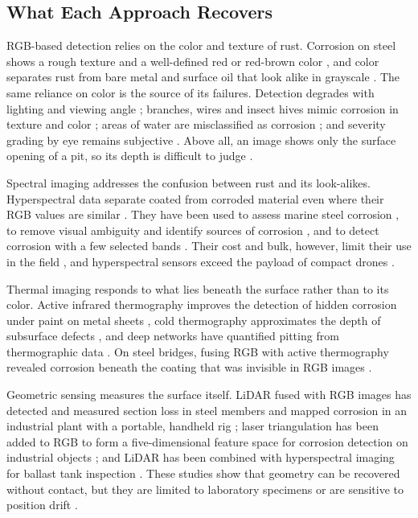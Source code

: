 \subsection{What Each Approach Recovers}

RGB-based detection relies on the color and texture of rust. Corrosion on steel
shows a rough texture and a well-defined red or red-brown color \citep{Rahman2021,HerndonTien2025}, and
color separates rust from bare metal and surface oil that look alike in
grayscale \citep{Hu2023}. The same reliance on color is the source of its failures.
Detection degrades with lighting and viewing angle \citep{Hu2023,Yu2023,HerndonTien2025}; branches,
wires and insect hives mimic corrosion in texture and color \citep{HerndonTien2025}; areas of
water are misclassified as corrosion \citep{Rahman2021}; and severity grading by eye remains
subjective \citep{Li2024b}. Above all, an image shows only the surface opening of a pit,
so its depth is difficult to judge \citep{Suzuki2026}.

Spectral imaging addresses the confusion between rust and its look-alikes.
Hyperspectral data separate coated from corroded material even where their RGB
values are similar \citep{PallasEnguita2025}. They have been used to assess marine steel
corrosion \citep{Arias2025}, to remove visual ambiguity and identify sources of corrosion
\citep{Lavadiya2022}, and to detect corrosion with a few selected bands \citep{Hernndez-Surez2026}. Their cost and bulk, however, limit
their use in the field \citep{Tang2025}, and hyperspectral sensors exceed the payload of
compact drones \citep{PallasEnguita2025}.

Thermal imaging responds to what lies beneath the surface rather than to its
color. Active infrared thermography improves the detection of hidden corrosion
under paint on metal sheets \citep{Elizalde2023}, cold thermography approximates the depth of
subsurface defects \citep{Doshvarpassand2022}, and deep networks have quantified pitting from
thermographic data \citep{Liu2021}. On steel bridges, fusing RGB with active thermography
revealed corrosion beneath the coating that was invisible in RGB images \citep{Lim2021}.

Geometric sensing measures the surface itself. LiDAR fused with RGB images has
detected and measured section loss in steel members \citep{Maru2025} and mapped corrosion
in an industrial plant with a portable, handheld rig \citep{PimenteldeFigueiredo2025}; laser triangulation
has been added to RGB to form a five-dimensional feature space for corrosion
detection on industrial objects \citep{Haitz2022}; and LiDAR has been combined with
hyperspectral imaging for ballast tank inspection \citep{PallasEnguita2025}. These studies show
that geometry can be recovered without contact, but they are limited to
laboratory specimens \citep{Maru2025,PallasEnguita2025} or are sensitive to position drift \citep{PimenteldeFigueiredo2025}.

